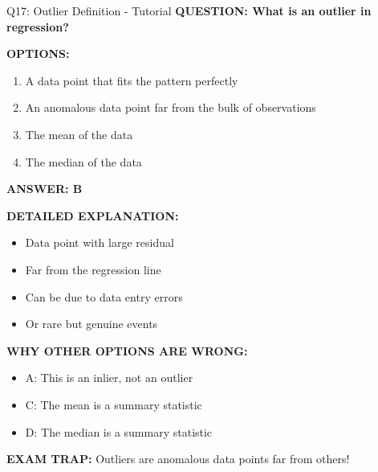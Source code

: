 \documentclass[8pt]{beamer}
\begin{document}
	\begin{frame}{Q17: Outlier Definition - Tutorial}
		\fontsize{6.5}{7.5}\selectfont
		\textbf{QUESTION: What is an outlier in regression?}
		
		\vspace{0.1cm}
		\textbf{OPTIONS:}
		\begin{enumerate}
			\item A data point that fits the pattern perfectly
			\item An anomalous data point far from the bulk of observations
			\item The mean of the data
			\item The median of the data
		\end{enumerate}
		
		\vspace{0.1cm}
		\textcolor{myblue}{\textbf{ANSWER: B}}
		
		\vspace{0.1cm}
		\textbf{DETAILED EXPLANATION:}
		\begin{itemize}
			\item Data point with large residual
			\item Far from the regression line
			\item Can be due to data entry errors
			\item Or rare but genuine events
		\end{itemize}
		
		\vspace{0.1cm}
		\textcolor{myred}{\textbf{WHY OTHER OPTIONS ARE WRONG:}}
		\begin{itemize}
			\item \textcolor{myred}{A:} This is an inlier, not an outlier
			\item \textcolor{myred}{C:} The mean is a summary statistic
			\item \textcolor{myred}{D:} The median is a summary statistic
		\end{itemize}
		
		\textcolor{myred}{\textbf{EXAM TRAP:}} Outliers are \textcolor{myblue}{anomalous data points far from others}!
	\end{frame}
	
\end{document}

